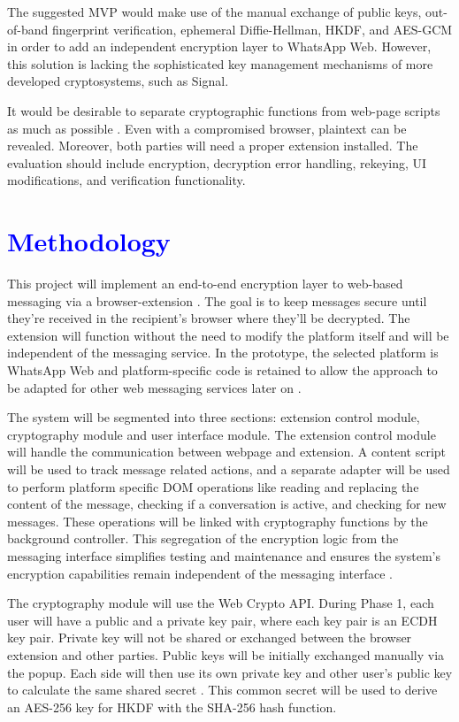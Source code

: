 \documentclass[11pt]{article}
\newcommand{\tb}{\textcolor{blue}}
\begin{document}
The suggested MVP would make use of the manual exchange of public keys,
out-of-band fingerprint verification, ephemeral Diffie-Hellman, HKDF, and AES-GCM in order to add an independent encryption layer to WhatsApp Web.
However, this solution is lacking the sophisticated key management mechanisms of more developed cryptosystems, such as Signal.

It would be desirable to separate cryptographic functions from web-page scripts as much as possible \cite{chrome-extension-security}. Even with a compromised
browser, plaintext can be revealed. Moreover, both parties will need a proper extension installed. The evaluation should include encryption, decryption error handling,
rekeying, UI modifications, and verification functionality.


\section{\tb{Methodology}}
This project will implement an end-to-end encryption layer to web-based messaging via a browser-extension \cite{chrome-extension-security,phishcatcher2023}. The goal is to keep messages secure until they're received in the recipient's browser where they'll be decrypted. The extension will function without the need to modify the platform itself and will be independent of the messaging service. In the prototype, the selected platform is WhatsApp Web and platform-specific code is retained to allow the approach to be adapted for other web messaging services later on \cite{messageguard}.

The system will be segmented into three sections: extension control module, cryptography module and user interface module. The extension control module will handle the communication between webpage and extension. A content script will be used to track message related actions, and a separate adapter will be used to perform platform specific DOM operations like reading and replacing the content of the message, checking if a conversation is active, and checking for new messages. These operations will be linked with cryptography functions by the background controller. This segregation of the encryption logic from the messaging interface simplifies testing and maintenance and ensures the system's encryption capabilities remain independent of the messaging interface \cite{chrome-extension-security}.

The cryptography module will use the Web Crypto API. During Phase 1, each user will have a public and a private key pair, where each key pair is an ECDH key pair. Private key will not be shared or exchanged between the browser extension and other parties. Public keys will be initially exchanged manually via the popup. Each side will then use its own private key and other user's public key to calculate the same shared secret \cite{signal-protocol,imauth2024}. This common secret will be used to derive an AES-256 key for HKDF with the SHA-256 hash function.
\end{document}
